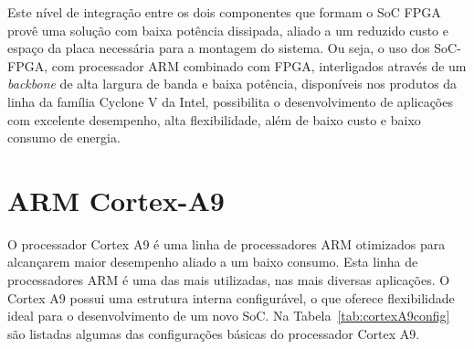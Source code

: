 Este nível de integração entre os dois componentes que formam o SoC FPGA provê uma solução com baixa potência dissipada, aliado a um reduzido custo e  espaço da placa necessária para a montagem do sistema. Ou seja, o uso dos SoC-FPGA, com processador ARM combinado com FPGA, interligados através de um \textit{backbone} de alta largura de banda e baixa potência, disponíveis nos produtos da linha da família Cyclone V da Intel, possibilita o desenvolvimento de aplicações com excelente desempenho, alta flexibilidade, além de baixo custo e baixo consumo de energia. 

\section{ARM Cortex-A9}
O processador Cortex A9 é uma linha de processadores ARM otimizados para alcançarem maior desempenho aliado a um baixo consumo. Esta linha de processadores ARM é uma das mais utilizadas, nas mais diversas aplicações. O Cortex A9 possui uma estrutura interna configurável, o que oferece flexibilidade ideal para o desenvolvimento de um novo SoC.  Na Tabela~\ref{tab:cortexA9config} são listadas algumas das configurações básicas do processador Cortex A9.

